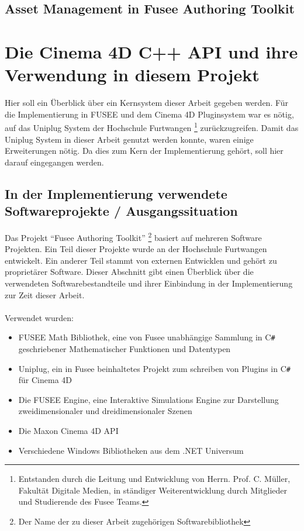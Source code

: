 \documentclass[pagesize, paper=a4, fontsize=12pt,titlepage=true, headings=small, headnosepline, abstractoff, liststotoc, nochapterprefix, plainheadsepline, twoside]{scrreprt}
\newcommand{\CSS}{C\texttt{\# }}
\begin{document}
\subsection{Asset Management in Fusee Authoring Toolkit}


\section{Die Cinema 4D C++ API und ihre Verwendung in diesem Projekt}
Hier soll ein Überblick über ein Kernsystem dieser Arbeit gegeben werden. Für die Implementierung in FUSEE und dem Cinema 4D Pluginsystem war es nötig, auf das Uniplug System der Hochschule Furtwangen \footnote{Entstanden durch die Leitung und Entwicklung von Herrn. Prof. C. Müller, Fakultät Digitale Medien, in ständiger Weiterentwicklung durch Mitglieder und Studierende des Fusee Teams.} zurückzugreifen. Damit das Uniplug System in dieser Arbeit genutzt werden konnte, waren einige Erweiterungen nötig. Da dies zum Kern der Implementierung gehört, soll hier darauf eingegangen werden.
\subsection{In der Implementierung verwendete Softwareprojekte / Ausgangssituation}
Das Projekt “Fusee Authoring Toolkit” \footnote{Der Name der zu dieser Arbeit zugehörigen Softwarebibliothek} basiert auf mehreren Software Projekten. Ein Teil dieser Projekte wurde an der Hochschule Furtwangen entwickelt. Ein anderer Teil stammt von externen Entwicklen und gehört zu proprietärer Software. Dieser Abschnitt gibt einen Überblick über die verwendeten Softwarebestandteile und ihrer Einbindung in der Implementierung zur Zeit dieser Arbeit.
\\
\\
Verwendet wurden:
\begin{itemize}
\item FUSEE Math Bibliothek, eine von Fusee unabhängige Sammlung in \CSS geschriebener Mathematischer Funktionen und Datentypen
\item Uniplug, ein in Fusee beinhaltetes Projekt zum schreiben von Plugins in \CSS für Cinema 4D
\item Die FUSEE Engine, eine Interaktive Simulations Engine zur Darstellung zweidimensionaler und dreidimensionaler Szenen
\item Die Maxon Cinema 4D API
\item Verschiedene Windows Bibliotheken aus dem .NET Universum
\end{itemize}
\end{document}
